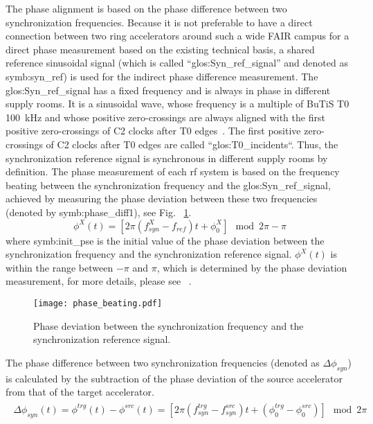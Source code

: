 The phase alignment is based on the phase difference between two synchronization frequencies. Because it is not preferable to have a direct connection between two ring accelerators around such a wide FAIR campus for a direct phase measurement based on the existing technical basis, a shared reference sinusoidal signal (which is called “\gls{glos:Syn_ref_signal}” and denoted as \gls{symb:syn_ref}) is used for the indirect phase difference measurement. The \gls{glos:Syn_ref_signal} has a fixed frequency and is always in phase in different supply rooms. It is a sinusoidal wave, whose frequency is a multiple of BuTiS T0 \SI{100}{kHz} and whose positive zero-crossings are always aligned with the first positive zero-crossings of C2 clocks after T0 edges~\cite{ferrand_system_2014, ferrand_system_2015}. The first positive zero-crossings of C2 clocks after T0 edges are called ``\gls{glos:T0_incidents}``. Thus, the synchronization reference signal is synchronous in different supply rooms by definition. The phase measurement of each rf system is based on the frequency beating between the synchronization frequency and the \gls{glos:Syn_ref_signal}, achieved by measuring the phase deviation between these two frequencies (denoted by \gls{symb:phase_diff1}), see Fig. ~\ref{phase_diffe_align}. 
\begin{equation}
\phi^X(t)= [2\pi(f_\mathit{syn}^{X}-f_\mathit{ref})t+\phi^X_0] \mod 2\pi - \pi
\end{equation}
where \gls{symb:init_pse} is the initial value of the phase deviation between the synchronization frequency and the synchronization reference signal. $\phi^X(t)$ is within the range between $-\pi$ and $\pi$, which is determined by the phase deviation measurement, for more details, please see ~\cite{ferrand_development_nodate}.
\begin{figure}[!htb]
   \centering   
   \texttt{[image: phase\_beating.pdf]}
   \caption{Phase deviation between the synchronization frequency and the synchronization reference signal.}
   \label{phase_diffe_align}
\end{figure}

The phase difference between two synchronization frequencies (denoted as $\Delta \phi_\mathit{syn}$) is calculated by the subtraction of the phase deviation of the source accelerator from that of the target accelerator. 
\begin{eqnarray}
\begin{aligned}
\Delta \phi_\mathit{syn}(t)
=\phi^\mathit{trg}(t)-\phi^\mathit{src}(t)=[2\pi(f_\mathit{syn}^{trg}-f_\mathit{syn}^{src})t+(\phi^\mathit{trg}_0-\phi^\mathit{src}_0)] \mod 2\pi
\label{phase_diff_dev}
\end{aligned}
\end{eqnarray}

